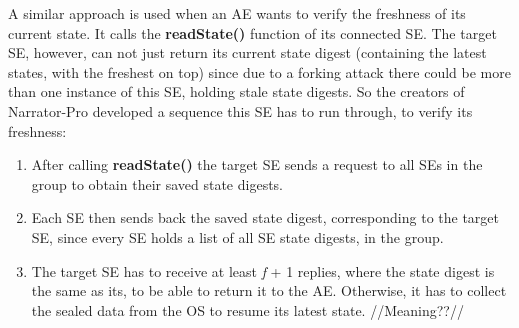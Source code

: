 A similar approach is used when an AE wants to verify the freshness of its current state. It calls the \textbf{readState()} function of its connected SE. The target SE, however, can not just return its current state digest (containing the latest states, with the freshest on top)
since due to a forking attack there could be more than one instance of this SE, holding stale state digests. So the creators of Narrator-Pro developed a sequence this SE has to run through, to verify its freshness:
\begin{enumerate}
    \item After calling \textbf{readState()} the target SE sends a request to all SEs in the group to obtain their saved state digests.
    \item Each SE then sends back the saved state digest, corresponding to the target SE, since every SE holds a list of all SE state digests, in the group.
    \item The target SE has to receive at least \textit{f} + 1 replies, where the state digest is the same as its, to be able to return it to the AE. Otherwise, it has to collect the sealed data from the OS to resume its latest state. //Meaning??//
\end{enumerate}



